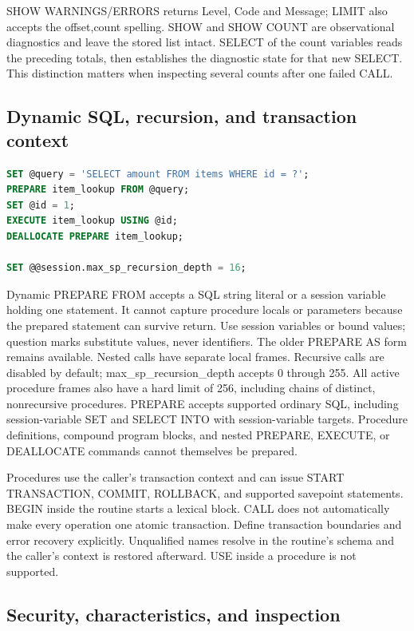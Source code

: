 SHOW WARNINGS/ERRORS returns Level, Code and Message; LIMIT also accepts
the offset,count spelling. SHOW and SHOW COUNT are observational diagnostics
and leave the stored list intact. SELECT of the count variables reads the
preceding totals, then establishes the diagnostic state for that new SELECT.
This distinction matters when inspecting several counts after one failed CALL.

\subsection{Dynamic SQL, recursion, and transaction context}

\begin{lstlisting}[language=SQL]
SET @query = 'SELECT amount FROM items WHERE id = ?';
PREPARE item_lookup FROM @query;
SET @id = 1;
EXECUTE item_lookup USING @id;
DEALLOCATE PREPARE item_lookup;

SET @@session.max_sp_recursion_depth = 16;
\end{lstlisting}

Dynamic PREPARE FROM accepts a SQL string literal or a session variable holding
one statement. It cannot capture procedure locals or parameters because the
prepared statement can survive return. Use session variables or bound values;
question marks substitute values, never identifiers. The older PREPARE AS form
remains available. Nested calls have separate local frames. Recursive calls
are disabled by default; max\_sp\_recursion\_depth accepts 0 through 255.
All active procedure frames also have a hard limit of 256, including chains of
distinct, nonrecursive procedures. PREPARE accepts supported ordinary SQL,
including session-variable SET and SELECT INTO with session-variable targets.
Procedure definitions, compound program blocks, and nested PREPARE, EXECUTE,
or DEALLOCATE commands cannot themselves be prepared.

Procedures use the caller's transaction context and can issue START TRANSACTION,
COMMIT, ROLLBACK, and supported savepoint statements. BEGIN inside the routine
starts a lexical block. CALL does not automatically make every operation one
atomic transaction. Define transaction boundaries and error recovery explicitly.
Unqualified names resolve in the routine's schema and the caller's context is
restored afterward. USE inside a procedure is not supported.

\subsection{Security, characteristics, and inspection}

